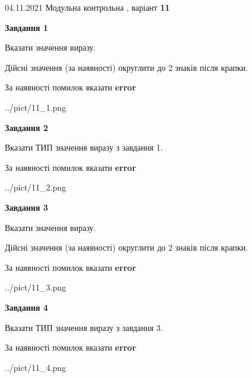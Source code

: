 \documentclass[11pt, ukrainian]{article}
\begin{document}
{04.11.2021 Модульна контрольна , варіант  \No \textbf { 11 }\par}
{
\begin {large}
{\begin {center}\textbf{Завдання 1}\end {center}}\par
Вказати значення виразу. \par
Дійсні значення (за наявності) округлити до 2 знаків після крапки. \par
За наявності помилок вказати \textbf{error}

\begin{center}
	{../pict/11_1.png}
\end{center}
\newpage

{\begin {center}\textbf{Завдання 2}\end {center}}\par
Вказати ТИП значення виразу з завдання 1. \par
За наявності помилок вказати \textbf{error}

\begin{center}
	{../pict/11_2.png}
\end{center}
\newpage

{\begin {center}\textbf{Завдання 3}\end {center}}\par
Вказати значення виразу. \par
Дійсні значення (за наявності) округлити до 2 знаків після крапки. \par
За наявності помилок вказати \textbf{error}

\begin{center}
	{../pict/11_3.png}
\end{center}
\newpage

{\begin {center}\textbf{Завдання 4}\end {center}}\par
Вказати ТИП значення виразу з завдання 3. \par
За наявності помилок вказати \textbf{error}

\begin{center}
	{../pict/11_4.png}
\end{center}
\newpage


\end{large}}
\end{document}
